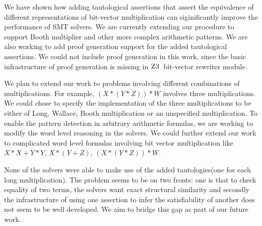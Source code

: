 We have shown how adding tautological assertions that assert the
equivalence of different representations of bit-vector multiplication
can siginificantly improve the performance of SMT solvers.  We are
currently extending our procedure to support Booth multiplier and
other more complex arithmetic patterns.  We are also working to add
proof generation support for the added tautological assertions.  We
could not include proof generation in this work, since the basic
infrastructure of proof generation is missing in $\textsc{Z3}$~bit-vector
rewriter module.
%

We plan to extend our work to problems involving different
combinations of multiplications. For example, $(X*(Y*Z))*W$ involves
three multiplications. We could chose to specify the implementation of
the three multiplications to be either of Long, Wallace, Booth
multiplication or an unspecified multiplication. To enable the pattern
detection in arbitrary arithmetic formulas, we are working to modify
the word level reasoning in the solvers.
We could further extend our work to complicated word level formulas involving bit vector multiplication like $X*X + Y*Y$, $X*(Y+Z)$, $(X*(Y*Z))*W$.

None of the solvers were able to make use of the added tautologies(one for each long multiplication). 
The problem seems to be on two fronts: one is that to check equality of two terms, the solvers want exact structural similarity and secondly the infrastructure of using one assertion to infer the satisfiability of another does not seem to be well developed. 
We aim to bridge this gap as part of our future work.




